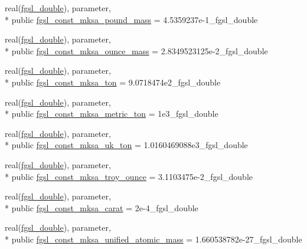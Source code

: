 \begin{DoxyCompactItemize}
\item 
real(\hyperlink{classfgsl_a9af5113378e0f000eb479d3f90196ddf}{fgsl\-\_\-double}), parameter, \\*
public \hyperlink{classfgsl_ad3cb7ad76502d5665ed74c2306e2b5f2}{fgsl\-\_\-const\-\_\-mksa\-\_\-pound\-\_\-mass} = 4.\-5359237e-\/1\-\_\-fgsl\-\_\-double
\item 
real(\hyperlink{classfgsl_a9af5113378e0f000eb479d3f90196ddf}{fgsl\-\_\-double}), parameter, \\*
public \hyperlink{classfgsl_ad41b90538ca94b0ba552ed733d732c4b}{fgsl\-\_\-const\-\_\-mksa\-\_\-ounce\-\_\-mass} = 2.\-8349523125e-\/2\-\_\-fgsl\-\_\-double
\item 
real(\hyperlink{classfgsl_a9af5113378e0f000eb479d3f90196ddf}{fgsl\-\_\-double}), parameter, \\*
public \hyperlink{classfgsl_a28b9223526d6d5565fda3d778045fee0}{fgsl\-\_\-const\-\_\-mksa\-\_\-ton} = 9.\-0718474e2\-\_\-fgsl\-\_\-double
\item 
real(\hyperlink{classfgsl_a9af5113378e0f000eb479d3f90196ddf}{fgsl\-\_\-double}), parameter, \\*
public \hyperlink{classfgsl_a0d771fd3ef9d093957328b9555c6a604}{fgsl\-\_\-const\-\_\-mksa\-\_\-metric\-\_\-ton} = 1e3\-\_\-fgsl\-\_\-double
\item 
real(\hyperlink{classfgsl_a9af5113378e0f000eb479d3f90196ddf}{fgsl\-\_\-double}), parameter, \\*
public \hyperlink{classfgsl_a3eea842ca98526b2c06b85da367b7579}{fgsl\-\_\-const\-\_\-mksa\-\_\-uk\-\_\-ton} = 1.\-0160469088e3\-\_\-fgsl\-\_\-double
\item 
real(\hyperlink{classfgsl_a9af5113378e0f000eb479d3f90196ddf}{fgsl\-\_\-double}), parameter, \\*
public \hyperlink{classfgsl_a7046241db07bad6371b685e812c9d177}{fgsl\-\_\-const\-\_\-mksa\-\_\-troy\-\_\-ounce} = 3.\-1103475e-\/2\-\_\-fgsl\-\_\-double
\item 
real(\hyperlink{classfgsl_a9af5113378e0f000eb479d3f90196ddf}{fgsl\-\_\-double}), parameter, \\*
public \hyperlink{classfgsl_ab0deb9fa34a456a2db1c8833499c5b2f}{fgsl\-\_\-const\-\_\-mksa\-\_\-carat} = 2e-\/4\-\_\-fgsl\-\_\-double
\item 
real(\hyperlink{classfgsl_a9af5113378e0f000eb479d3f90196ddf}{fgsl\-\_\-double}), parameter, \\*
public \hyperlink{classfgsl_a0e18a0c505ad7f70865f8d0351dbec24}{fgsl\-\_\-const\-\_\-mksa\-\_\-unified\-\_\-atomic\-\_\-mass} = 1.\-660538782e-\/27\-\_\-fgsl\-\_\-double

\end{DoxyCompactItemize}

